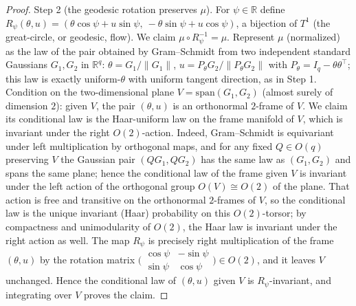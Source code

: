 \documentclass[11pt]{article}
\theoremstyle{definition}
\theoremstyle{plain}
\newcommand{\R}{\mathbb{R}}
\begin{document}
\begin{proof}
Step 2 (the geodesic rotation preserves $\mu$). For $\psi\in\R$ define
$R_\psi(\theta,u)=(\theta\cos\psi+u\sin\psi,\ -\theta\sin\psi+u\cos\psi)$,
a bijection of $T^1$ (the great-circle, or geodesic, flow). We claim $\mu\circ R_\psi^{-1}=\mu$. Represent $\mu$ (normalized) as the law of the pair obtained by Gram--Schmidt from two independent standard Gaussians $G_1,G_2$ in $\R^q$:
$\theta=G_1/\|G_1\|$, $u=P_\theta G_2/\|P_\theta G_2\|$ with $P_\theta=I_q-\theta\theta^\top$; this law is exactly uniform-$\theta$ with uniform tangent direction, as in Step 1. Condition on the two-dimensional plane $V=\mathrm{span}(G_1,G_2)$ (almost surely of dimension $2$): given $V$, the pair $(\theta,u)$ is an orthonormal $2$-frame of $V$. We claim its conditional law is the Haar-uniform law on the frame manifold of $V$, which is invariant under the right $O(2)$-action. Indeed, Gram--Schmidt is equivariant under left multiplication by orthogonal maps, and for any fixed $Q\in O(q)$ preserving $V$ the Gaussian pair $(QG_1,QG_2)$ has the same law as $(G_1,G_2)$ and spans the same plane; hence the conditional law of the frame given $V$ is invariant under the left action of the orthogonal group $O(V)\cong O(2)$ of the plane. That action is free and transitive on the orthonormal $2$-frames of $V$, so the conditional law is the unique invariant (Haar) probability on this $O(2)$-torsor; by compactness and unimodularity of $O(2)$, the Haar law is invariant under the right action as well. The map $R_\psi$ is precisely right multiplication of the frame $(\theta,u)$ by the rotation matrix $\big(\begin{smallmatrix}\cos\psi&-\sin\psi\\ \sin\psi&\cos\psi\end{smallmatrix}\big)\in O(2)$, and it leaves $V$ unchanged. Hence the conditional law of $(\theta,u)$ given $V$ is $R_\psi$-invariant, and integrating over $V$ proves the claim.


\end{proof}
\end{document}
